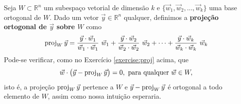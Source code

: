 Seja $W \subset \mathbb{R}^n$ um subespaço vetorial de dimensão $k$ e $\{\vec{w}_1, \vec{w}_2, \dots, \vec{w}_k \}$ uma base ortogonal de $W$. Dado um vetor $\vec{y} \in \mathbb{R}^n$ qualquer, definimos a \textbf{projeção ortogonal de $\vec{y}$ sobre $W$} como
\begin{equation}
\proj_W \vec{y}  = \frac{\vec{y} \cdot \vec{w}_1}{\vec{w}_1 \cdot \vec{w}_1} \ \vec{w}_1 + \frac{\vec{y} \cdot \vec{w}_2}{\vec{w}_2 \cdot \vec{w}_2} \ \vec{w}_2 + \cdots + \frac{\vec{y} \cdot \vec{w}_k}{\vec{w}_k \cdot \vec{w}_k} \ \vec{w}_k
\end{equation} Pode-se verificar, como no Exercício \ref{exercise:proj} acima, que
\begin{equation}
\vec{w} \cdot  \big( \vec{y} - \operatorname{proj}_W \vec{y} \big) = 0, \ \text{para qualquer } \vec{w} \in W,
\end{equation} isto é, a projeção $\operatorname{proj}_W \vec{y}$ pertence a $W$ e $\vec{y} - \operatorname{proj}_W \vec{y}$ é ortogonal a todo elemento de $W$, assim como nossa intuição esperaria.


